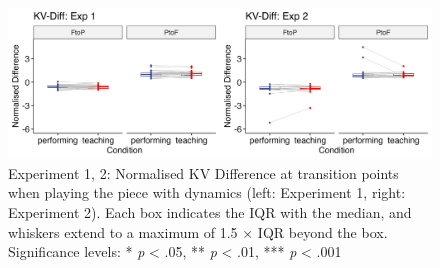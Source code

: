 \documentclass[
  man,floatsintext]{apa6}
\begin{document}
\begin{figure}
\includegraphics[width=1\linewidth]{manuscript_files/figure-latex/plot-vel-diff-2-1} \caption{\label{fig:vel-diff-2}Experiment 1, 2: Normalised KV Difference at transition points when playing the piece with dynamics (left: Experiment 1, right: Experiment 2). Each box indicates the IQR with the median, and whiskers extend to a maximum of 1.5 × IQR beyond the box. Significance levels: * \textit{p} < .05, ** \textit{p} < .01, *** \textit{p} < .001}\label{fig:plot-vel-diff-2}
\end{figure}
\end{document}
